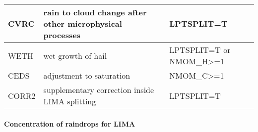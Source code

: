 \begin{longtable} {|p{}|p{}|p{}|}
CVRC   & rain to cloud change after other microphysical processes & LPTSPLIT=T \\\hline
WETH   & wet growth of hail                                       & LPTSPLIT=T or NMOM\_H>=1 \\\hline
CEDS   & adjustment to saturation                                 & NMOM\_C>=1 \\\hline
CORR2  & supplementary correction inside LIMA splitting           & LPTSPLIT=T \\\hline
\end{longtable}

\paragraph{Concentration of raindrops for LIMA}
\mbox{} %

